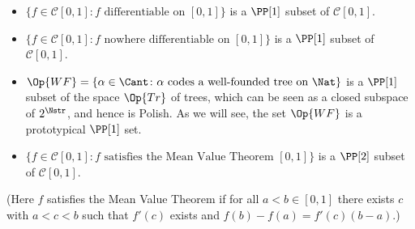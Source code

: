 \documentclass[letterpaper,10pt,english]{jupyterBook}
\begin{document}
\sphinxAtStartPar
{}
\begin{itemize}
\item {} 
\sphinxAtStartPar
\(\{f \in \mathcal{C}[0,1]\colon f \text{ differentiable on } [0,1]\}\) is a \(\PP[1]\) subset of \(\mathcal{C}[0,1]\).

\item {} 
\sphinxAtStartPar
\(\{f \in \mathcal{C}[0,1]\colon f \text{ nowhere differentiable on } [0,1]\}\) is a \(\PP[1]\) subset of \(\mathcal{C}[0,1]\).

\item {} 
\sphinxAtStartPar
\(\Op{WF} = \{\alpha \in \Cant \colon \alpha \text{ codes a well-founded tree on } \Nat \}\) is a \(\PP[1]\) subset of the space \(\Op{Tr}\) of trees, which can be seen as a closed subspace of \(2^{\Nstr}\), and hence is Polish. As we will see, the set \(\Op{WF}\) is a prototypical \(\PP[1]\) set.

\end{itemize}

\sphinxAtStartPar
{}
\begin{itemize}
\item {} 
\sphinxAtStartPar
\(\{f \in \mathcal{C}[0,1]\colon f \text{ satisfies the Mean Value Theorem } [0,1]\}\) is a \(\PP[2]\) subset of \(\mathcal{C}[0,1]\).

\end{itemize}

\sphinxAtStartPar
(Here \(f\) satisfies the Mean Value Theorem if for all \(a < b \in [0,1]\) there exists \(c\) with \(a < c < b\) such that  \(f'(c)\) exists and \(f(b) - f(a) = f'(c)(b-a)\).)
\end{document}
